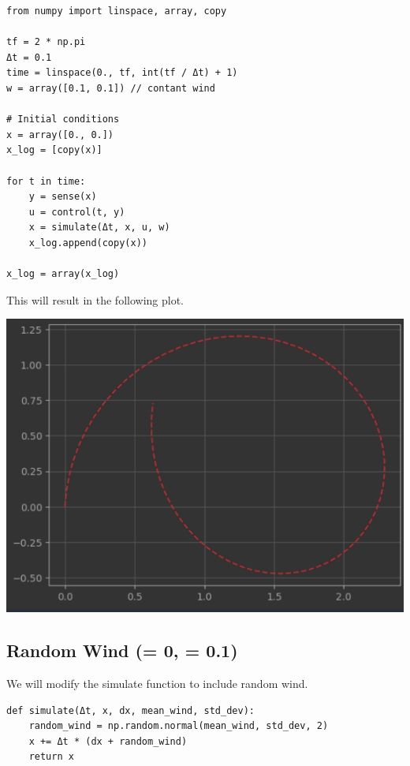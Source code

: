 \documentclass[letterpaper, 10 pt, conference]{ieeeconf}  %
\begin{document}
    \begin{lstlisting}[label={lst:lstlistin7}]
from numpy import linspace, array, copy

tf = 2 * np.pi
Δt = 0.1
time = linspace(0., tf, int(tf / Δt) + 1)
w = array([0.1, 0.1]) // contant wind

# Initial conditions
x = array([0., 0.])
x_log = [copy(x)]

for t in time:
    y = sense(x)
    u = control(t, y)
    x = simulate(Δt, x, u, w)
    x_log.append(copy(x))

x_log = array(x_log)
    \end{lstlisting}
    This will result in the following plot.
    \begin{center}
        \includegraphics[scale=0.4]{exercise-4-1}
    \end{center}

    \subsection{Random Wind (\mu = 0, \sigma = 0.1)}
    We will modify the simulate function to include random wind.
    \begin{lstlisting}[label={lst:lstlistin8}]
def simulate(Δt, x, dx, mean_wind, std_dev):
    random_wind = np.random.normal(mean_wind, std_dev, 2)
    x += Δt * (dx + random_wind)
    return x
    \end{lstlisting}
\end{document}
